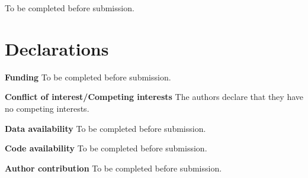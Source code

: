 \documentclass[pdflatex,sn-mathphys-num,iicol,twocolumn]{sn-jnl}
\theoremstyle{thmstyleone}
\theoremstyle{thmstylethree}
\theoremstyle{thmstyletwo}
\begin{document}
\backmatter

To be completed before submission.

\section*{Declarations}

\noindent\textbf{Funding} To be completed before submission.

\noindent\textbf{Conflict of interest/Competing interests} The authors declare that they have no competing interests.

\noindent\textbf{Data availability} To be completed before submission.

\noindent\textbf{Code availability} To be completed before submission.

\noindent\textbf{Author contribution} To be completed before submission.


\end{document}
